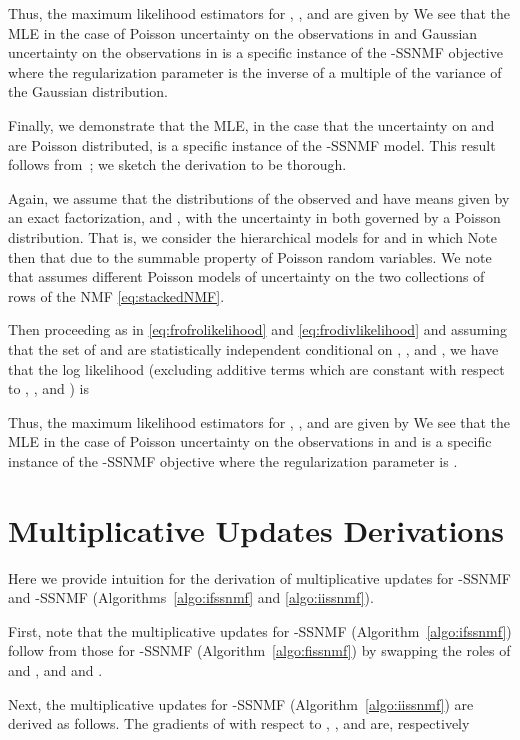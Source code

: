 \documentclass[twocolumn,10pt]{article}
\begin{document}
{\footnotesize }Thus, the maximum likelihood estimators for , , and  are given by 
  We see that the MLE in the case of Poisson uncertainty on the observations in  and Gaussian uncertainty on the observations in  is a specific instance of the -SSNMF objective where the regularization parameter  is the inverse of a multiple of the variance of the Gaussian distribution.

  
Finally, we demonstrate that the MLE, in the case that the uncertainty on  and  are Poisson distributed, is a specific instance of the -SSNMF model.  This result follows from~\cite{cemgil2008bayesian,favaro20073,virtanen2008bayesian}; we sketch the derivation to be thorough.  

Again, we assume that the distributions of the observed   and  have means given by an exact factorization,  and , with the uncertainty in both governed by a Poisson distribution.  That is, we consider the hierarchical models for  and  in which  
 Note then that   due to the summable property of Poisson random variables.  We note that assumes different Poisson models of uncertainty on the two collections of rows of the NMF \eqref{eq:stackedNMF}. 

Then proceeding as in \eqref{eq:frofrolikelihood} and \eqref{eq:frodivlikelihood} and assuming 
that the set of  and  are statistically independent conditional on , , and , we have that the 
log likelihood (excluding additive terms which are constant with respect to , , and ) is 

Thus, the maximum likelihood estimators for , , and  are given by 
  We see that the MLE in the case of Poisson uncertainty on the observations in  and  is a specific instance of the -SSNMF objective where the regularization parameter is .

\section{Multiplicative Updates Derivations}\label{sec:appendixB}
Here we provide intuition for the derivation of multiplicative updates for -SSNMF and -SSNMF (Algorithms~\ref{algo:ifssnmf} and \ref{algo:iissnmf}).


First, note that the multiplicative updates for -SSNMF (Algorithm~\ref{algo:ifssnmf}) follow from those for -SSNMF (Algorithm~\ref{algo:fissnmf}) by swapping the roles of  and , and  and .


Next, the multiplicative updates for -SSNMF (Algorithm~\ref{algo:iissnmf}) 
are derived as follows.  
The gradients of  with respect to , , and  are, respectively
\end{document}
